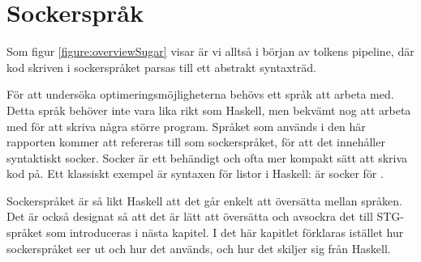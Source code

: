 \documentclass[Rapport]{subfiles}
\begin{document}
\chapter{Sockerspråk}
\label{sec:Socker}

%
%
%
%
%
%
%

%





\overviewSugar

Som figur \ref{figure:overviewSugar} visar är vi alltså i början av tolkens pipeline, där kod skriven i sockerspråket parsas till ett abstrakt syntaxträd.

För att undersöka optimeringsmöjligheterna behövs ett språk att arbeta med. 
Detta språk behöver inte vara lika rikt som Haskell, men bekvämt nog
att arbeta med för att skriva några större program. Språket som används i den
här rapporten kommer att refereras till som sockerspråket, för att det 
innehåller syntaktiskt socker. Socker är ett behändigt och ofta mer kompakt sätt 
att skriva kod på. Ett klassiskt exempel är syntaxen
för listor i Haskell: \miniCode{[5,0,4]} är socker för .

Sockerspråket är så likt Haskell att det går enkelt att översätta mellan språken.
Det är också designat så att det är lätt att översätta och avsockra det till 
STG-språket som introduceras i nästa kapitel. I det här kapitlet
förklaras istället hur sockerspråket ser ut och hur det används, och hur
det skiljer sig från Haskell.
\end{document}
